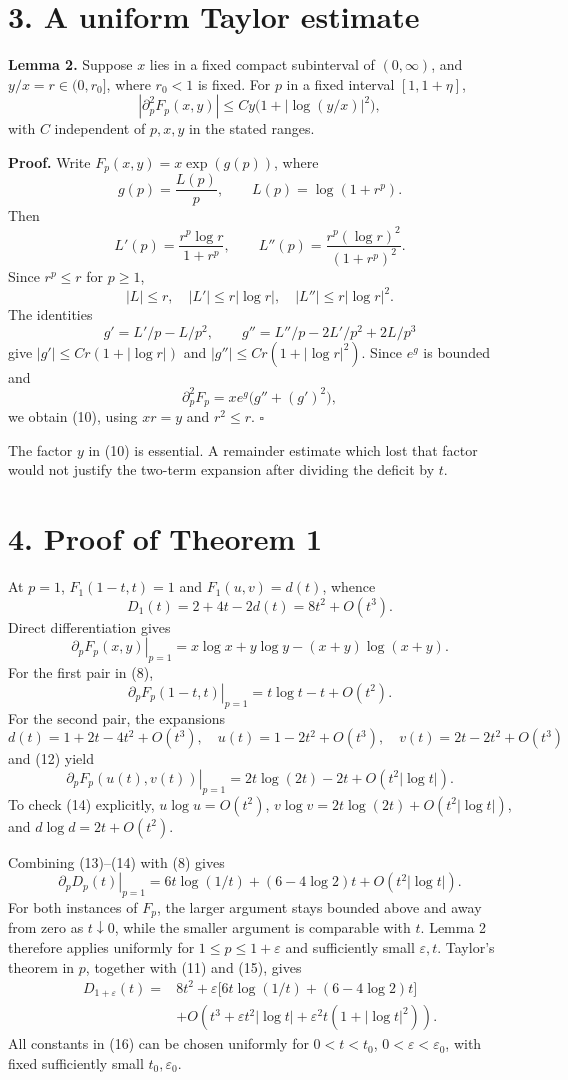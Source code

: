 \documentclass[11pt,a4paper]{article}
\begin{document}
\section*{3. A uniform Taylor estimate}\label{a-uniform-taylor-estimate}

\textbf{Lemma 2.} Suppose \(x\) lies in a fixed compact subinterval of \((0,\infty)\), and \(y/x=r\in(0,r_0]\), where \(r_0<1\) is fixed. For \(p\) in a fixed interval \([1,1+\eta]\), \[
\left|\partial_p^2 F_p(x,y)\right|\le C y\bigl(1+|\log(y/x)|^2\bigr), \tag{10}
\] with \(C\) independent of \(p,x,y\) in the stated ranges.

\textbf{Proof.} Write \(F_p(x,y)=x\exp(g(p))\), where \[
g(p)=\frac{L(p)}p,\qquad L(p)=\log(1+r^p).
\] Then \[
L'(p)=\frac{r^p\log r}{1+r^p},\qquad
L''(p)=\frac{r^p(\log r)^2}{(1+r^p)^2}.
\] Since \(r^p\le r\) for \(p\ge1\), \[
|L|\le r,\quad |L'|\le r|\log r|,\quad |L''|\le r|\log r|^2.
\] The identities \[
g'=L'/p-L/p^2,\qquad
g''=L''/p-2L'/p^2+2L/p^3
\] give \(|g'|\le Cr(1+|\log r|)\) and \(|g''|\le Cr(1+|\log r|^2)\). Since \(e^g\) is bounded and \[
\partial_p^2F_p=x e^g\bigl(g''+(g')^2\bigr),
\] we obtain (10), using \(xr=y\) and \(r^2\le r\). \(\square\)

The factor \(y\) in (10) is essential. A remainder estimate which lost that factor would not justify the two-term expansion after dividing the deficit by \(t\).

\section*{4. Proof of Theorem 1}\label{proof-of-theorem-1}

At \(p=1\), \(F_1(1-t,t)=1\) and \(F_1(u,v)=d(t)\), whence \[
D_1(t)=2+4t-2d(t)=8t^2+O(t^3). \tag{11}
\] Direct differentiation gives \[
\left.\partial_pF_p(x,y)\right|_{p=1}
=x\log x+y\log y-(x+y)\log(x+y). \tag{12}
\] For the first pair in (8), \[
\left.\partial_pF_p(1-t,t)\right|_{p=1}
=t\log t-t+O(t^2). \tag{13}
\] For the second pair, the expansions \[
d(t)=1+2t-4t^2+O(t^3),\quad
u(t)=1-2t^2+O(t^3),\quad
v(t)=2t-2t^2+O(t^3)
\] and (12) yield \[
\left.\partial_pF_p(u(t),v(t))\right|_{p=1}
=2t\log(2t)-2t+O(t^2|\log t|). \tag{14}
\] To check (14) explicitly, \(u\log u=O(t^2)\), \(v\log v=2t\log(2t)+O(t^2|\log t|)\), and \(d\log d=2t+O(t^2)\).

Combining (13)--(14) with (8) gives \[
\left.\partial_pD_p(t)\right|_{p=1}
=6t\log(1/t)+(6-4\log2)t+O(t^2|\log t|). \tag{15}
\] For both instances of \(F_p\), the larger argument stays bounded above and away from zero as \(t\downarrow0\), while the smaller argument is comparable with \(t\). Lemma 2 therefore applies uniformly for \(1\le p\le1+\varepsilon\) and sufficiently small \(\varepsilon,t\). Taylor's theorem in \(p\), together with (11) and (15), gives \[
\begin{split}
D_{1+\varepsilon}(t)
={}&8t^2+\varepsilon\bigl[6t\log(1/t)+(6-4\log2)t\bigr]\\
&+O\!\left(t^3+\varepsilon t^2|\log t|
+\varepsilon^2t(1+|\log t|^2)\right).
\end{split}\tag{16}
\] All constants in (16) can be chosen uniformly for \(0<t<t_0\), \(0<\varepsilon<\varepsilon_0\), with fixed sufficiently small \(t_0,\varepsilon_0\).
\end{document}
